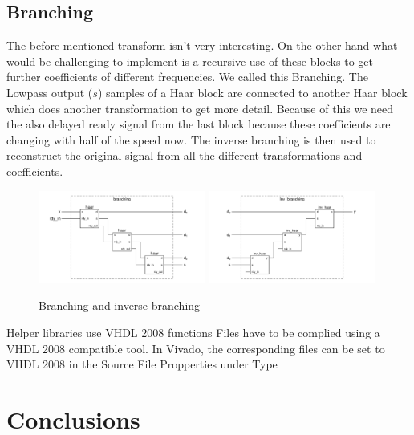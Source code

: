 \begin{refsection}
\subsection{Branching}

The before mentioned transform isn't very interesting. On the other hand what would be challenging to implement is a recursive use of these blocks to get further coefficients of different frequencies.
We called this Branching. The Lowpass output ($s$) samples of a Haar block are connected to another Haar block which does another transformation to get more detail. Because of this we need the also delayed ready signal from the last block because these coefficients are changing with half of the speed now. 
The inverse branching  is then used to reconstruct the original signal from all the different transformations and coefficients.
\begin{figure}
	\includegraphics[width=0.49\textwidth]{images/branching.pdf}
	\includegraphics[width=0.49\textwidth]{images/inv_branching.pdf}
	\caption{Branching and inverse branching \label{fpga:branching}}
\end{figure}



Helper libraries use VHDL 2008 functions
Files have to be complied using a VHDL 2008 compatible tool. In Vivado, the corresponding files can be set to VHDL 2008 in the Source File Propperties under Type 



\section{Conclusions}

\printbibliography[heading=subbibliography]
\end{refsection}
